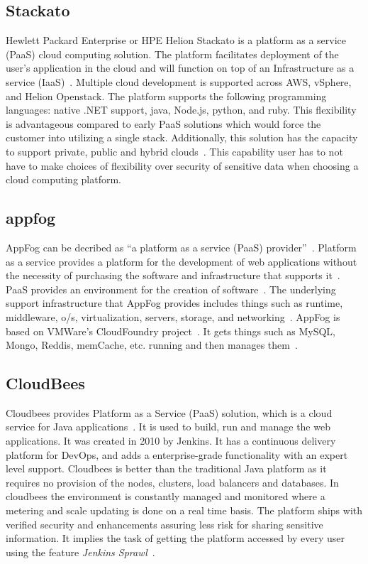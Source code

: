 \subsection{Stackato}
    
Hewlett Packard Enterprise or HPE Helion Stackato is a platform as a
service (PaaS) cloud computing solution.  The platform facilitates
deployment of the user's application in the cloud and will function on
top of an Infrastructure as a service (IaaS)~\cite{www-hpe}. Multiple
cloud development is supported across AWS, vSphere, and Helion
Openstack.  The platform supports the following programming languages:
native .NET support, java, Node.js, python, and ruby.  This
flexibility is advantageous compared to early PaaS solutions which
would force the customer into utilizing a single stack.  Additionally,
this solution has the capacity to support private, public and hybrid
clouds~\cite{www-virt}. This capability user has to not have to make
choices of flexibility over security of sensitive data when choosing a
cloud computing platform.

    \pv
 
    
\subsection{appfog}

AppFog can be decribed as ``a platform as a service (PaaS)
provider''~\cite{wee}. Platform as a service provides a platform for
the development of web applications without the necessity of
purchasing the software and infrastructure that supports
it~\cite{kepes}. PaaS provides an environment for the creation of
software~\cite{kepes}. The underlying support infrastructure that
AppFog provides includes things such as runtime, middleware, o/s,
virtualization, servers, storage, and networking~\cite{appfog}. AppFog
is based on VMWare's CloudFoundry project~\cite{wee}. It gets things
such as MySQL, Mongo, Reddis, memCache, etc. running and then manages
them~\cite{tweney}.

    \pv
    
\subsection{CloudBees}

Cloudbees provides Platform as a Service (PaaS) solution, which is a
cloud service for Java applications~\cite{www-cloudbees-wiki}. It is
used to build, run and manage the web applications. It was created in
2010 by Jenkins. It has a continuous delivery platform for DevOps, and
adds a enterprise-grade functionality with an expert level
support. Cloudbees is better than the traditional Java platform as it
requires no provision of the nodes, clusters, load balancers and
databases. In cloudbees the environment is constantly managed and
monitored where a metering and scale updating is done on a real time
basis. The platform ships with verified security and enhancements
assuring less risk for sharing sensitive information. It implies the
task of getting the platform accessed by every user using the feature
\textit{Jenkins Sprawl}~\cite{www-cloudbees-webpage}.

